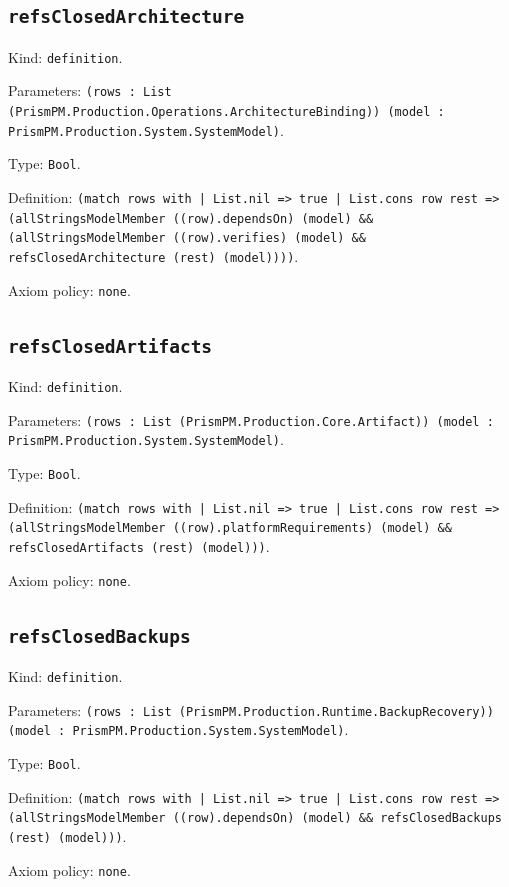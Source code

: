 \documentclass[11pt]{article}
\begin{document}
\subsection*{\texttt{refsClosedArchitecture}}
\noindent Kind: \texttt{definition}.\par
\noindent Parameters: \texttt{(rows : List (PrismPM.Production.Operations.ArchitectureBinding)) (model : PrismPM.Production.System.SystemModel)}.\par
\noindent Type: \texttt{Bool}.\par
\noindent Definition: \texttt{(match rows with | List.nil => true | List.cons row rest => (allStringsModelMember ((row).dependsOn) (model) \&\& (allStringsModelMember ((row).verifies) (model) \&\& refsClosedArchitecture (rest) (model))))}.\par
\noindent Axiom policy: \texttt{none}.\par
\subsection*{\texttt{refsClosedArtifacts}}
\noindent Kind: \texttt{definition}.\par
\noindent Parameters: \texttt{(rows : List (PrismPM.Production.Core.Artifact)) (model : PrismPM.Production.System.SystemModel)}.\par
\noindent Type: \texttt{Bool}.\par
\noindent Definition: \texttt{(match rows with | List.nil => true | List.cons row rest => (allStringsModelMember ((row).platformRequirements) (model) \&\& refsClosedArtifacts (rest) (model)))}.\par
\noindent Axiom policy: \texttt{none}.\par
\subsection*{\texttt{refsClosedBackups}}
\noindent Kind: \texttt{definition}.\par
\noindent Parameters: \texttt{(rows : List (PrismPM.Production.Runtime.BackupRecovery)) (model : PrismPM.Production.System.SystemModel)}.\par
\noindent Type: \texttt{Bool}.\par
\noindent Definition: \texttt{(match rows with | List.nil => true | List.cons row rest => (allStringsModelMember ((row).dependsOn) (model) \&\& refsClosedBackups (rest) (model)))}.\par
\noindent Axiom policy: \texttt{none}.\par
\end{document}
